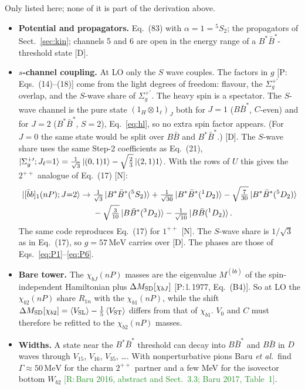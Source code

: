 \documentclass[11pt,a4paper]{article}
\newcommand{\tagP}[1]{\textcolor{blue!65!black}{\textsf{\small[P:\,#1]}}}
\newcommand{\tagR}[1]{\textcolor{ForestGreen}{\textsf{\small[R:\,#1]}}}
\newcommand{\tagD}{\textcolor{orange!85!black}{\textsf{\small[D]}}}
\newcommand{\tagN}{\textcolor{red!70!black}{\textsf{\small[N]}}}
\newcommand{\BB}{B\bar B}
\newcommand{\BBst}{B\bar B^*}
\newcommand{\BstBst}{B^*\bar B^*}
\newcommand{\bbnP}{[\bar bb]_1(nP)}
\newcommand{\MeV}{\,\mathrm{MeV}}
\begin{document}
Only listed here; none of it is part of the derivation above.
\begin{itemize}
\item \textbf{Potential and propagators.} Eq.~(83) with $\alpha=1={}^5S_2$; the propagators of Sect.~\ref{sec:kin}; channels 5 and 6 are open in the energy range of a $\BstBst$-threshold state \tagD.
\item \textbf{$s$-channel coupling.} At LO only the $S$ wave couples. The factors in $g$ \tagP{Eqs.~(14)--(18)} come from the light degrees of freedom: flavour, the $\Sigma_g^{+\prime}$ overlap, and the $S$-wave share of $\Sigma_g^{+\prime}$. The heavy spin is a spectator. The $S$-wave channel is the pure state $(1_H\otimes1_\ell)_J$ both for $J=1$ ($\BBst$, $C$-even) and for $J=2$ ($\BstBst$, $S=2$), Eq.~\eqref{eq:hl}, so no extra spin factor appears. (For $J=0$ the same state would be split over $\BB$ and $\BstBst$.) \tagD. The $S$-wave share uses the same Step-2 coefficients as Eq.~(21), $\ket{\Sigma_g^{+\prime};J_\ell{=}1}=\frac{1}{\sqrt3}\ket{(0,1)1}-\sqrt{\frac23}\ket{(2,1)1}$. With the rows of $U$ this gives the $2^{++}$ analogue of Eq.~(17) \tagN:
\begin{align*}
\ket{\bbnP;J{=}2}\to{}&\tfrac{1}{\sqrt3}\ket{\BstBst(^5S_2)}+\tfrac{1}{\sqrt{30}}\ket{\BstBst(^1D_2)}-\sqrt{\tfrac{7}{30}}\ket{\BstBst(^5D_2)}\\
&-\sqrt{\tfrac{3}{10}}\ket{\BBst(^3D_2)}-\tfrac{1}{\sqrt{10}}\ket{\BB(^1D_2)}.
\end{align*}
The same code reproduces Eq.~(17) for $1^{++}$ \tagN. The $S$-wave share is $1/\sqrt3$ as in Eq.~(17), so $g=57\MeV$ carries over \tagD. The phases are those of Eqs.~\eqref{eq:P1}--\eqref{eq:P6}.
\item \textbf{Bare tower.} The $\chi_{bJ}(nP)$ masses are the eigenvalue $M^{(\bar bb)}$ of the spin-independent Hamiltonian plus $\Delta M_{\rm SD}[\chi_{bJ}]$ \tagP{l.\,1977, Eq.~(B4)}. So at LO the $\chi_{b2}(nP)$ share $R_{1n}$ with the $\chi_{b1}(nP)$, while the shift $\Delta M_{\rm SD}[\chi_{b2}]=\braket{V_{\rm SL}}-\frac15\braket{V_{\rm ST}}$ differs from that of $\chi_{b1}$. $V_0$ and $C$ must therefore be refitted to the $\chi_{b2}(nP)$ masses.
\item \textbf{Widths.} A state near the $\BstBst$ threshold can decay into $\BBst$ and $\BB$ in $D$ waves through $V_{15}$, $V_{16}$, $V_{35}$, \dots. With nonperturbative pions Baru \emph{et al.}\ find $\Gamma\approx50\MeV$ for the charm $2^{++}$ partner and a few MeV for the isovector bottom $W_{b2}$ \tagR{Baru 2016, abstract and Sect.~3.3; Baru 2017, Table~1}.
\end{itemize}
\end{document}
